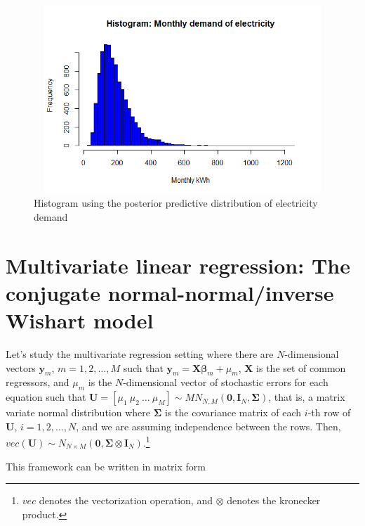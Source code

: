 \begin{figure}[!h]
	\includegraphics[width=340pt, height=200pt]{Chapters/chapter4/figures/PredDemElect.png}
	\caption[List of figure caption goes here]{Histogram using the posterior predictive distribution of electricity demand}\label{fig41}
\end{figure}

 
\section{Multivariate linear regression: The conjugate normal-normal/inverse Wishart model}\label{sec44}

Let's study the multivariate regression setting where there are $N$-dimensional vectors ${\bm{y}}_m$, $m=1,2,\dots,M$ such that ${\bm{y}}_m={\bm{X}}\bm{\beta}_m+\mu_m$, ${\bm{X}}$ is the set of common regressors, and $\mu_m$ is the $N$-dimensional vector of stochastic errors for each equation such that ${\bm{U}}=[\mu_1 \ \mu_2 \ \dots \ \mu_M]\sim MN_{N,M}({\bm{0}}, {\bm{I}}_N, {\bm{\Sigma}})$, that is, a matrix variate normal distribution where $\bm{\Sigma}$ is the covariance matrix of each $i$-th row of ${\bm{U}}$, $i=1,2,\dots,N$, and we are assuming independence between the rows. Then, $vec({\bm U})\sim N_{N\times M}({\bm 0}, \bm{\Sigma}\otimes {\bm{I}}_N)$.\footnote{$vec$ denotes the vectorization operation, and $\otimes$ denotes the kronecker product.}

This framework can be written in matrix form


